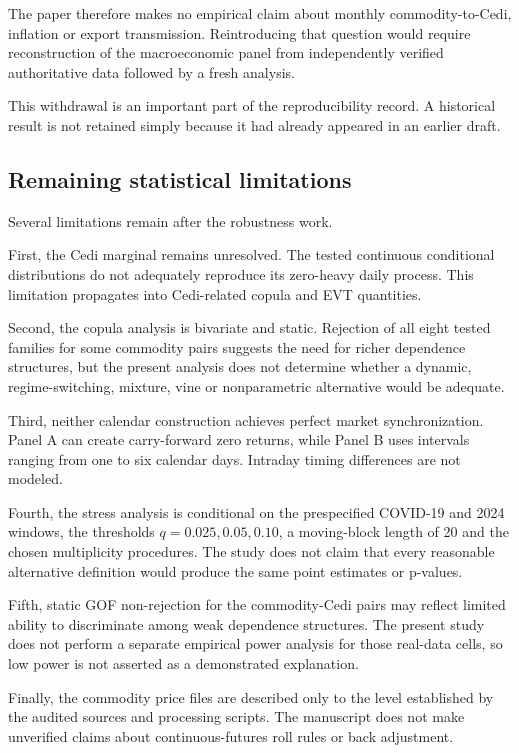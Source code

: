 The paper therefore makes no empirical claim about monthly commodity-to-Cedi, inflation or export transmission. Reintroducing that question would require reconstruction of the macroeconomic panel from independently verified authoritative data followed by a fresh analysis.

This withdrawal is an important part of the reproducibility record. A historical result is not retained simply because it had already appeared in an earlier draft.

\subsection{Remaining statistical limitations}

Several limitations remain after the robustness work.

First, the Cedi marginal remains unresolved. The tested continuous conditional distributions do not adequately reproduce its zero-heavy daily process. This limitation propagates into Cedi-related copula and EVT quantities.

Second, the copula analysis is bivariate and static. Rejection of all eight tested families for some commodity pairs suggests the need for richer dependence structures, but the present analysis does not determine whether a dynamic, regime-switching, mixture, vine or nonparametric alternative would be adequate.

Third, neither calendar construction achieves perfect market synchronization. Panel A can create carry-forward zero returns, while Panel B uses intervals ranging from one to six calendar days. Intraday timing differences are not modeled.

Fourth, the stress analysis is conditional on the prespecified COVID-19 and 2024 windows, the thresholds \(q=0.025,0.05,0.10\), a moving-block length of 20 and the chosen multiplicity procedures. The study does not claim that every reasonable alternative definition would produce the same point estimates or p-values.

Fifth, static GOF non-rejection for the commodity-Cedi pairs may reflect limited ability to discriminate among weak dependence structures. The present study does not perform a separate empirical power analysis for those real-data cells, so low power is not asserted as a demonstrated explanation.

Finally, the commodity price files are described only to the level established by the audited sources and processing scripts. The manuscript does not make unverified claims about continuous-futures roll rules or back adjustment.

